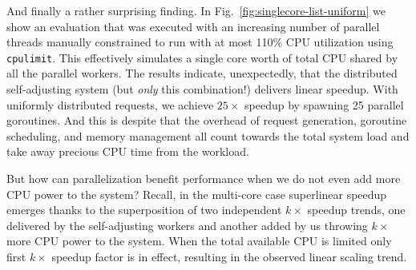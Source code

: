 And finally a rather surprising finding. In Fig.~\ref{fig:singlecore-list-uniform} we show an evaluation that was executed with an increasing number of parallel threads manually constrained to run with at most 110\% CPU utilization using \texttt{cpulimit}. This effectively simulates a single core worth of total CPU shared by all the parallel workers. The results indicate, unexpectedly, that the distributed self-adjusting system (but \emph{only} this combination!) delivers linear speedup. With uniformly distributed requests, we achieve $25\times$ speedup by spawning 25 parallel goroutines.  And this is despite that the overhead of request generation, goroutine scheduling, and memory management all count towards the total system load and take away precious CPU time from the workload.  

But how can parallelization benefit performance when we do not even add more CPU power to the system? Recall, in the multi-core case superlinear speedup emerges thanks to the superposition of two independent $k\times$ speedup trends, one delivered by the self-adjusting workers and another added by us throwing $k\times$ more CPU power to the system. When the total available CPU is limited only first $k\times$ speedup factor is in effect, resulting in the observed linear scaling trend.


%








